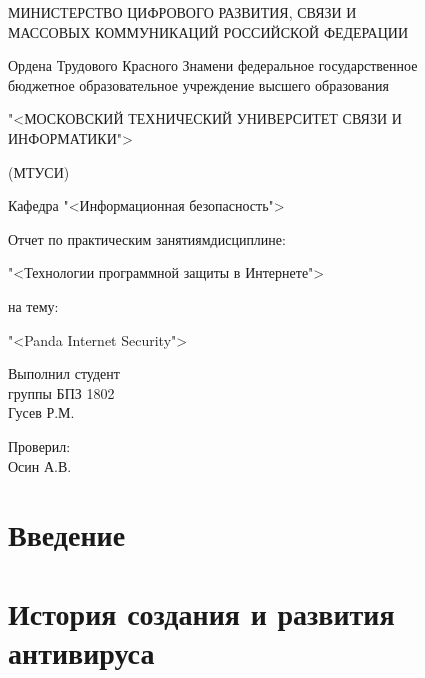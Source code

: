 

    \thispagestyle{empty}
    \begin{center}
        \begin{bfseries}
            \MakeUppercase{Министерство цифрового развития, связи и \\
            массовых коммуникаций Российской федерации}\par
            \bigskip
            Ордена Трудового Красного Знамени федеральное государственное \\
            бюджетное образовательное учреждение высшего образования\par
            \bigskip
            \MakeUppercase{"<Московский Технический Университет Связи И\\Информатики">}\par
            \bigskip
            (МТУСИ)\par\bigskip
        \end{bfseries}
        Кафедра "<Информационная безопасность">\par\bigskip\bigskip
        Отчет по практическим занятиям дисциплине:\par
        "<Технологии программной защиты в Интернете">\par
        на тему:\par"<Panda Internet Security">\par\bigskip
    \end{center}
    \begin{flushright}
        Выполнил студент\\группы БПЗ 1802\\ Гусев Р.М.\par
        \bigskip
        Проверил:\\Осин А.В.
    \end{flushright}
    \vspace*{\fill}
    \pagebreak

    \tableofcontents

    \pagebreak

    \section*{Введение}
    \pagebreak

    \section{История создания и развития антивируса}
    \pagebreak

